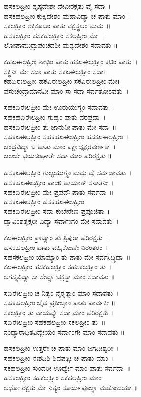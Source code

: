 ಹಸಕಲಹ್ರೀಂ ಪೃಷ್ಠದೇಶೇ ದೇವೀರಕ್ಷತು ವೈ ಸದಾ~।\\
ಹಸಕಹಲಹ್ರೀಂ ಕುಕ್ಷಿದೇಶಂ ಮಹಾವಿದ್ಯಾ ಚ ಪಾತು ಮಾಂ~।\\
ಸಕಲಹ್ರೀಂ ಶಕ್ತಿಕೂಟಂ ಪಾತು ವಕ್ಷಸ್ಥಲಂ ಮಮ~॥\\
ಹಸಕಲಹ್ರೀಂ ಹಸಕಹಲಹ್ರೀಂ ಸಕಲಹ್ರೀಂ ಮೇ~।\\
ಲೋಪಾಮುದ್ರಾಪಂಚದಶೀ ಮಧ್ಯದೇಶಂ ಸದಾವತು ॥

ಕಹಏಈಲಹ್ರೀಂ ನಾಭಿಂ ಪಾತು ಹಕಏಈಲಹ್ರೀಂ ಕಟಿಂ ಪಾತು~।\\
ಸಕ್ಥಿನೀ ಮೇ ಸದಾ ಪಾತು ಸಕಏಈಲಹ್ರೀಂ ಸದಾ॥\\
ಕಹಏಈಲಹ್ರೀಂ ಹಕಏಈಲಹ್ರೀಂ ಸಕಏಈಲಹ್ರೀಂ ಮೇ।\\
ವಸುಚಂದ್ರಾಮಾನವೀ ಮಾಂ ಸಾ ಸದಾ ಸರ್ವತೋಽವತು ॥

ಸಹಕಏಈಲಹ್ರೀಂ ಮೇ ಊರುಯುಗ್ಮಂ ಸದಾವತು~।\\
ಸಹಕಹಏಈಲಹ್ರೀಂ ಗುಹ್ಯಂ ಪಾತು ವರಪ್ರದಾ~।\\
ಹಸಕಏಈಲಹ್ರೀಂ ತು ಜಾನುನೀ ಪಾತು ಮೇ ಸದಾ~॥\\
ಸಹಕಏಈಲಹ್ರೀಂ ಸಹಕಹಏಈಲಹ್ರೀಂ ಹಸಕಏಈಲಹ್ರೀಂ~।\\
ಚಂದ್ರವಿದ್ಯಾ ಚ ಪಾತು ಮಾಂ ಪಕ್ಷಾದ್ಯಕ್ಷರವರ್ಣಕಾ~।\\
ಜಲಜೇ ಭಯಸಂಘಾತೇ ಸದಾ ಮಾಂ ಪರಿರಕ್ಷತು ॥

ಹಸಕಏಈಲಹ್ರೀಂ ಗುಲ್ಫಯುಗ್ಮಂ ಮಮ ವೈ ಸರ್ವದಾವತು~।\\
ಹಸಕಹಏಈಲಹ್ರೀಂ ಪಾದೌ ಪಾಯಾತ್ ಸನಾತನೀ~।\\
ಸಹಕಏಈಲಹ್ರೀಂ ಮೇ ಪ್ರಪದೌ ಪಾತು ಸರ್ವದಾ~॥\\
ಹಸಕಏಈಲಹ್ರೀಂ ಹಸಕಹಏಈಲಹ್ರೀಂ\\
ಸಹಕಏಈಲಹ್ರೀಂ ಸದಾ ಕುಬೇರೇಣ ಪ್ರಪೂಜಿತಾ~।\\
ದ್ವಾವಿಂಶತ್ಯಕ್ಷರೀ ವಿದ್ಯಾ ಸರ್ವಾಂಗಂ ಮೇ ಸದಾವತು ॥

ಕಏಈಲಹ್ರೀಂ ಪ್ರಾಚ್ಯಾಂ ತು ತ್ರಿಪುರಾ ಪರಿರಕ್ಷತು~।\\
ಹಸಕಹಲಹ್ರೀಂ ಪಾತು ವಹ್ನಿಕೋಣೇ ನಿರಂತರಂ~।\\
ಸಹಸಕಲಹ್ರೀಂ ಯಾಮ್ಯಾಂ ತು ಪಾತು ಮೇ ಸರ್ವಸಿದ್ಧಿದಾ~॥\\
ಕಏಈಲಹ್ರೀಂ ಹಸಕಹಲಹ್ರೀಂ ಸಹಸಕಲಹ್ರೀಂ ತು~।\\
ಅಗಸ್ತ್ಯವಿದ್ಯಾ ಸಾ ಸೇವ್ಯಾ ಚಕ್ರಸ್ಥಾ ಮಾಂ ಸದಾವತು ॥

ಸಏಈಲಹ್ರೀಂ ಚ ನಿತ್ಯಂ ನೈರೃತ್ಯಾಂ ಮಾಂ ಸದಾವತು~।\\
ಸಹಕಹಲಹ್ರೀಂ ಚೈವ ಪ್ರತೀಚ್ಯಾಂ ಪಾತು ಪಾರ್ವತೀ ॥\\
ಸಕಲಹ್ರೀಂ ತು ವಾಯವ್ಯೇ ಸದಾ ಮಾಂ ಪರಿರಕ್ಷತು~।\\
ಸಏಈಲಹ್ರೀಂ ಸಹಕಹಲಹ್ರೀಂ ಸಕಲಹ್ರೀಂ ತು~॥\\
ನಂದ್ಯಾರಾಧಿತವಿದ್ಯೇಯಂ ಸರ್ವಾಂಗೇ ಮಾಂ ಸದಾವತು ॥

ಹಸಕಲಹ್ರೀಂ ಉತ್ತರೇ ಚ ಪಾತು ಮಾಂ ಜಗದೀಶ್ವರೀ~।\\
ಸಹಕಲಹ್ರೀಂ ಈಶದಿಶಿ ಶಿವಪತ್ನೀ ಚ ಪಾತು ಮಾಂ~।\\
ಸಕಹಲಹ್ರೀಂ ಸುಂದರೀ ಊರ್ಧ್ವೇ ಮಾಂ ಪಾತು ಸರ್ವದಾ~॥\\
ಹಸಕಲಹ್ರೀಂ ಸಹಕಲಹ್ರೀಂ ಸಕಹಲಹ್ರೀಂ ಮಾಂ~।\\
ಅಧೋ ರಕ್ಷತು ಮೇ ನಿತ್ಯಂ ಸೂರ್ಯಪೂಜ್ಯಾ ಮಹೋದಯಾ ॥

